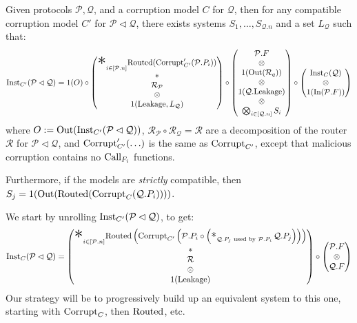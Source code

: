 \begin{theorem}
  \label{thm:horizontal_breakdown}
  Given protocols $\mathcal{P}, \mathcal{Q}$, and a corruption
  model $C$ for $\mathcal{Q}$, then for any compatible corruption
  model $C'$ for $\mathcal{P} \lhd \mathcal{Q}$, there exists
  systems $S_1, \ldots, S_{\mathcal{Q}.n}$ and a set $L_{\mathcal{Q}}$ such that:
  $$
  \tx{Inst}_{C'}(\mathcal{P} \lhd \mathcal{Q}) =
  1(O)\circ
  \begin{pmatrix}
    {\displaystyle \bigast}_{i \in [\mathcal{P}.n]} \tx{Routed}(\tx{Corrupt}'_{C'}(\mathcal{P}.P_i))
    \cr
    *\cr
    \mathcal{R}_{\mathcal{P}}\cr
    \otimes\cr
    1(\tx{Leakage}, L_{\mathcal{Q}})
  \end{pmatrix}
  \circ
  \begin{pmatrix}
    \mathcal{P}.F\cr
    \otimes\cr
    1(\tx{Out}(\mathcal{R}_q))\cr
    \otimes\cr
    1(\mathcal{Q}.\tx{Leakage})\cr
    \otimes\cr
    \bigotimes_{i \in [\mathcal{Q}.n]} S_i\cr
  \end{pmatrix}
  \circ
  \begin{pmatrix}
  \tx{Inst}_C(\mathcal{Q})\cr
  \otimes\cr
  1(\tx{In}(\mathcal{P}.F))
  \end{pmatrix}
  $$
  where $O := \text{Out}(\text{Inst}_{C'}(\mathcal{P} \lhd \mathcal{Q}))$,
  $\mathcal{R}_{\mathcal{P}} \circ \mathcal{R}_{\mathcal{Q}} = \mathcal{R}$
  are a decomposition of the router $\mathcal{R}$ for $\mathcal{P} \lhd \mathcal{Q}$,
  and $\text{Corrupt}'_{C'}(\ldots)$ is the same as $\text{Corrupt}_{C'}$,
  except that malicious corruption contains no $\text{Call}_{F_i}$ functions.

  Furthermore, if the models are \emph{strictly} compatible,
  then $S_j = 1(\text{Out}(\text{Routed}(\text{Corrupt}_C(\mathcal{Q}.P_i))))$.

 We start by unrolling $\text{Inst}_{C'}(\mathcal{P} \lhd \mathcal{Q})$,
to get:
\[
\tx{Inst}_C(\mathcal{P} \lhd \mathcal{Q}) =
  \begin{pmatrix}
    {\displaystyle \bigast}_{i \in [\mathcal{P}.n]} \tx{Routed}\left(\tx{Corrupt}_{C'}\left(\mathcal{P}.P_i \circ 
        \left( \bigast_{\mathcal{Q}.P_j \tx{ used by } \mathcal{P}.P_i} \mathcal{Q}.P_j \right)
    \right)\right)\cr
    *\cr
    \mathcal{R}\cr
    \otimes\cr
    1(\tx{Leakage})
  \end{pmatrix}
  \circ \begin{pmatrix}
    \mathcal{P}.F\cr
    \otimes \cr
    \mathcal{Q}.F
  \end{pmatrix}
\]
Our strategy will be to progressively build up an equivalent system
to this one, starting with $\text{Corrupt}_C$, then $\text{Routed}$, etc.


\end{theorem}
